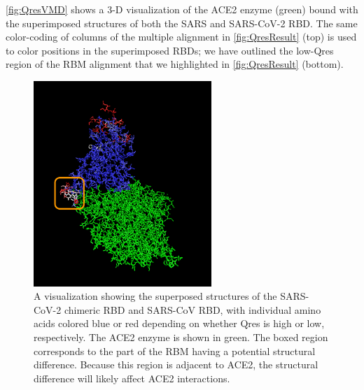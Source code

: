 \autoref{fig:QresVMD} shows a 3-D visualization of the ACE2 enzyme (green) bound with the superimposed structures of both the SARS and SARS-CoV-2 RBD. The same color-coding of columns of the multiple alignment in \autoref{fig:QresResult} (top) is used to color positions in the superimposed RBDs; we have outlined the low-Qres region of the RBM alignment that we highlighted in \autoref{fig:QresResult} (bottom).\\

\begin{figure}[h]
	\centering
	\mySfFamily
	\includegraphics[width = 0.6\textwidth]{../images/QresVMD.png}
	\caption{A visualization showing the superposed structures of the SARS-CoV-2 chimeric RBD  and SARS-CoV RBD, with individual amino acids colored blue or red depending on whether Qres is high or low, respectively.  The ACE2 enzyme is shown in green. The boxed region corresponds to the part of the RBM having a potential structural difference. Because this region is adjacent to ACE2, the structural difference will likely affect ACE2 interactions.}
	\label{fig:QresVMD}
\end{figure}

\begin{note}\end{note}


